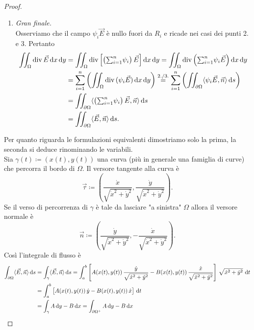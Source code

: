 \begin{proof}
\begin{enumerate}[label = \arabic*.]
\begin{enumerate}[label = \emph{(\roman*)}]
			\item \emph{Gran finale.} \\
			Osserviamo che il campo $ \psi_i \vec{E} $ è nullo fuori da $ R_i $ e ricade nei casi dei punti 2. e 3. Pertanto
			\begin{align*}
				\iint_{\Omega} \div{\vec{E}} \dif{x} \dif{y} & = \iint_{\Omega} \div{\left[\left(\textstyle{\sum_{i = 1}^{n}} \psi_i\right)\vec{E}\right]} \dif{x} \dif{y} = \iint_{\Omega} \div{\left(\textstyle{\sum_{i = 1}^{n}} \psi_i \vec{E}\right)} \dif{x} \dif{y} \\
				& = \sum_{i = 1}^{n}\left(\iint_{\Omega} \div{(\psi_i \vec{E})} \dif{x} \dif{y}\right) \overset{\text{2./3.}}{=} \sum_{i = 1}^{n}\left(\iint_{\partial \Omega} \langle {\psi_i \vec{E}, \vec{n}} \rangle \dif{s}\right) \\
				& = \iint_{\partial \Omega} \langle {\left(\textstyle{\sum_{i = 1}^{n}}\psi_i\right) \vec{E}, \vec{n}} \rangle \dif{s} \\
				& = \iint_{\partial \Omega} \langle {\vec{E}, \vec{n}} \rangle \dif{s}. \\
			\end{align*}
		\end{enumerate}
	\end{enumerate}
	Per quanto riguarda le formulazioni equivalenti dimostriamo solo la prima, la seconda si deduce rinominando le variabili. \\
	Sia $ \gamma(t) \coloneqq (x(t), y(t)) $ una curva (più in generale una famiglia di curve) che percorra il bordo di $ \Omega $. Il versore tangente alla curva è 
	\[
		\vec{\tau} \coloneqq \left(\frac{\dot{x}}{\sqrt{\dot{x}^2 + \dot{y}^2}}, \frac{\dot{y}}{\sqrt{\dot{x}^2 + \dot{y}^2}} \right).
	\]
	Se il verso di percorrenza di $ \gamma $ è tale da lasciare "a sinistra" $ \Omega $ allora il versore normale è
	\[
		\vec{n} \coloneqq \left(\frac{\dot{y}}{\sqrt{\dot{x}^2 + \dot{y}^2}}, -\frac{\dot{x}}{\sqrt{\dot{x}^2 + \dot{y}^2}} \right).
	\]
	Così l'integrale di flusso è 
	\begin{align*}
		\int_{\partial \Omega} \langle {\vec{E}, \vec{n}} \rangle \dif{s} & = \int_{\gamma} \langle {\vec{E}, \vec{n}} \rangle \dif{s} = \int_{a}^{b}\left[ A(x(t), y(t)) \, \frac{\dot{y}}{\sqrt{\dot{x}^2 + \dot{y}^2}} - B(x(t), y(t)) \, \frac{\dot{x}}{\sqrt{\dot{x}^2 + \dot{y}^2}}\right] \, \sqrt{\dot{x}^2 + \dot{y}^2} \, \dif{t} \\
		& = \int_{a}^{b}\left[ A(x(t), y(t)) \, \dot{y} - B(x(t), y(t)) \, \dot{x}\right] \, \dif{t} \\
		& = \int_{\gamma} A \dif{y} - B \dif{x} = \int_{\partial \Omega^+} A \dif{y} - B \dif{x} \qedhere
	\end{align*}
\end{proof}

